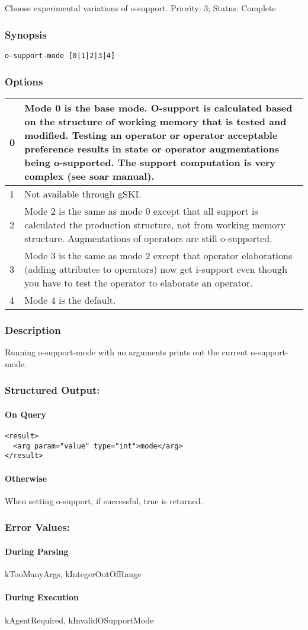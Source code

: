 \subsection{}
\label{o-support-mode}
Choose experimental variations of o-support. 
 Priority: 3; Status: Complete
\subsubsection*{Synopsis}
\begin{verbatim}
o-support-mode [0|1|2|3|4]
\end{verbatim}
\subsubsection*{Options}
\begin{tabular}{|l|l|}
\hline 
 0  & Mode 0 is the base mode. O-support is calculated based on the structure of working memory that is tested and modified. Testing an operator or operator acceptable preference results in state or operator augmentations being o-supported. The support computation is very complex (see soar manual).  \\
 \hline 
 1  & Not available through gSKI.  \\
 \hline 
 2  & Mode 2 is the same as mode 0 except that all support is calculated the production structure, not from working memory structure. Augmentations of operators are still o-supported.  \\
 \hline 
 3  & Mode 3 is the same as mode 2 except that operator elaborations (adding attributes to operators) now get i-support even though you have to test the operator to elaborate an operator.  \\
 \hline 
 4  & Mode 4 is the default.  \\
 \hline 
\end{tabular}
\subsubsection*{Description}
 Running o-support-mode with no arguments prints out the current o-support-mode. 
\subsubsection*{Structured Output:}
\paragraph*{On Query}
\begin{verbatim}
<result>
  <arg param="value" type="int">mode</arg>
</result>
\end{verbatim}
\paragraph*{Otherwise}
 When setting o-support, if successful, true is returned. 
\subsubsection*{Error Values:}
\paragraph*{During Parsing}
 kTooManyArgs, kIntegerOutOfRange
\paragraph*{During Execution}
 kAgentRequired, kInvalidOSupportMode
